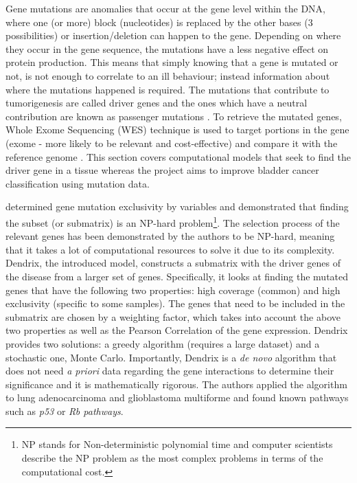 Gene mutations are anomalies that occur at the gene level within the DNA, where one (or more) block (nucleotides) is replaced by the other bases (3 possibilities) or insertion/deletion can happen to the gene. Depending on where they occur in the gene sequence, the mutations have a less negative effect on protein production. This means that simply knowing that a gene is mutated or not, is not enough to correlate to an ill behaviour; instead information about where the mutations happened is required. The mutations that contribute to tumorigenesis are called driver genes and the ones which have a neutral contribution are known as passenger mutations \cite{Ciriello2012-hi}. To retrieve the mutated genes, Whole Exome Sequencing (WES) technique is used to target portions in the gene (exome - more likely to be relevant and cost-effective) and compare it with the reference genome \cite{Schneider2016-ml}. This section covers computational models that seek to find the driver gene in a tissue whereas the project aims to improve bladder cancer classification using mutation data. 

\citet{Vandin2012-cf} determined gene mutation exclusivity by variables and demonstrated that finding the subset (or submatrix) is an NP-hard problem\footnote{ NP stands for Non-deterministic polynomial time and computer scientists describe the NP problem as the most complex problems in terms of the computational cost.}. The selection process of the relevant genes has been demonstrated by the authors to be NP-hard, meaning that it takes a lot of computational resources to solve it due to its complexity. Dendrix, the introduced model, constructs a submatrix with the driver genes of the disease from a larger set of genes. Specifically, it looks at finding the mutated genes that have the following two properties: high coverage (common) and high exclusivity (specific to some samples). The genes that need to be included in the submatrix are chosen by a weighting factor, which takes into account the above two properties as well as the Pearson Correlation of the gene expression. Dendrix provides two solutions: a greedy algorithm (requires a large dataset) and a stochastic one, Monte Carlo. Importantly, Dendrix is a \textit{de novo} algorithm that does not need \textit{a priori} data regarding the gene interactions to determine their significance and it is mathematically rigorous. The authors applied the algorithm to lung adenocarcinoma and glioblastoma multiforme and found known pathways such as \textit{p53} or \textit{Rb pathways}.


